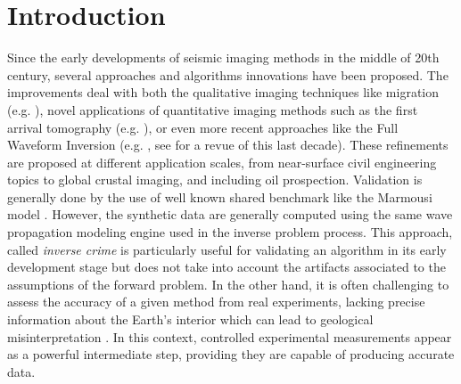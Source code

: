 \documentclass[manuscript,revised]{geophysics}
\begin{document}
\modulolinenumbers[5]
\linenumbers

\section{Introduction}


\noindent Since the early developments of seismic imaging methods in the middle of 20th century, several approaches and algorithms innovations have been proposed. The improvements deal with both the qualitative imaging techniques like migration (e.g. \citet{Berkhout_MSS_2012,Guofeng_GPU_2013}), novel applications of quantitative imaging methods such as the first arrival tomography (e.g. \citet{Bohm_CWS_2015}), or even more recent approaches like the Full Waveform Inversion (e.g. \citet{Perez_AWI_2014}, see \citet{Virieux_FWI_2009} for a revue of this last decade). These refinements are proposed at different application scales, from near-surface civil engineering topics to global crustal imaging, and including oil prospection. Validation is generally done by the use of well known shared benchmark like the Marmousi model \citep{martin2006marmousi2}. However, the synthetic data are generally computed using the same wave propagation modeling engine used in the inverse problem process. This  approach, called \textit{inverse crime} \citep{Wirgin_TIC_2004} is particularly useful for validating an algorithm in its early development stage but does not take into account the artifacts associated to the assumptions of the forward problem. In the other hand, it is often challenging to assess the accuracy of a given method from real experiments, lacking precise information about the Earth's interior which can lead to geological misinterpretation \citep{Morozov_ARF_2004}. In this context, controlled experimental measurements appear as a powerful intermediate step, providing they are capable of producing accurate data.
\end{document}
